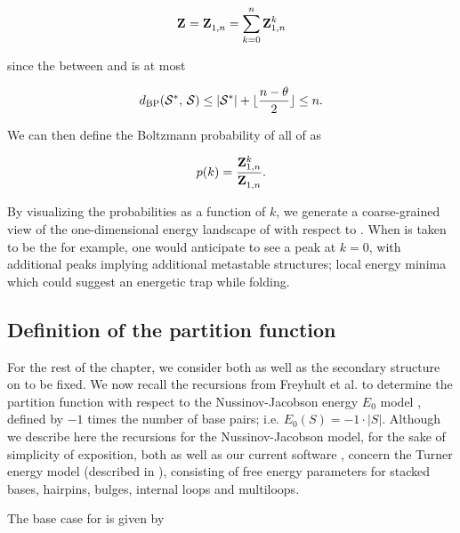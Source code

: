 \documentclass[11pt, oneside]{Thesis} %
\begin{document}
\begin{align}
\label{eq:fftbor:partFunc}
\fullZ = \bfZ{}{1,n} = \sum_{k=0}^n \bfZ{k}{1,n}
\end{align}

since the \bpd between \strSt and \str is at most

\begin{align}
\label{eq:fftbor:maxDist}
\dBP{\strSt}{\str} \leq |\strSt| + \lfloor \frac{n-\theta}{2} \rfloor \leq n.
\end{align}

We can then define the Boltzmann probability of all \kNbrs of \strSt as

\begin{align}
\label{eq:fftbor:probK}
p(k) =\frac{\bfZ{k}{1,n}}{\bfZ{}{1,n}}.
\end{align}

By visualizing the probabilities \pk as a function of $k$, we generate a
coarse-grained view of the one-dimensional energy landscape of \seq with
respect to \strSt. When \strSt is taken to be the \mfes for example, one would
anticipate to see a peak at $k=0$, with additional peaks implying additional
metastable structures; local energy minima which could suggest an energetic
trap while folding.

\subsection{Definition of the partition function
\texorpdfstring{}{}}
\label{subsec:fftbor:recursions}

For the rest of the chapter, we consider both \seq as well as the
secondary structure \strSt on \seq to be fixed. We now recall the
recursions from Freyhult et al. \citep{Freyhult.ab05} to determine
the partition function  with
respect to the Nussinov-Jacobson
energy $E_0$ model \citep{nussinovjacobson}, defined by
$-1$ times the number of base pairs; i.e. $E_0(S) = -1 \cdot |S|$.
Although we describe here the recursions for the Nussinov-Jacobson
model, for the sake of
simplicity of exposition, both \rnabor
\citep{Freyhult.ab05} as well as our current software \fftbor,
concern the Turner energy model (described in ), consisting of free energy parameters for
stacked bases, hairpins, bulges, internal loops and multiloops.


The base case for  is given by
\end{document}
